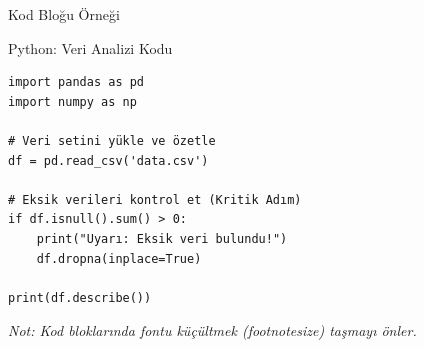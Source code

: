 \begin{frame}[fragile]{Kod Bloğu Örneği}
    
    \begin{block}{Python: Veri Analizi Kodu}
        \footnotesize 
        \begin{verbatim}
import pandas as pd
import numpy as np

# Veri setini yükle ve özetle
df = pd.read_csv('data.csv')

# Eksik verileri kontrol et (Kritik Adım)
if df.isnull().sum() > 0:
    print("Uyarı: Eksik veri bulundu!")
    df.dropna(inplace=True)

print(df.describe())
        \end{verbatim}
    \end{block}
    
    \vspace{0.5em}
    \centering
    \textit{\scriptsize Not: Kod bloklarında fontu küçültmek (footnotesize) taşmayı önler.}
\end{frame}
